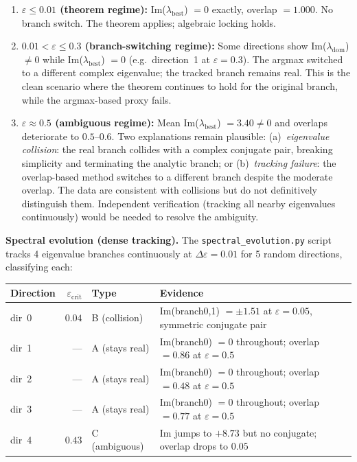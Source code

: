 \documentclass[11pt]{amsart}
\begin{document}
\begin{enumerate}
\item \textbf{$\varepsilon \leq 0.01$ (theorem regime):}
  Im($\lambda_\mathrm{best}$) $= 0$ exactly, overlap $= 1.000$.
  No branch switch. The theorem applies; algebraic locking holds.

\item \textbf{$0.01 < \varepsilon \leq 0.3$ (branch-switching regime):}
  Some directions show Im($\lambda_\mathrm{dom}$) $\neq 0$ while
  Im($\lambda_\mathrm{best}$) $= 0$ (e.g.\ direction~1 at $\varepsilon=0.3$).
  The argmax switched to a different complex eigenvalue;
  the tracked branch remains real.
  This is the clean scenario where the theorem continues to hold
  for the original branch, while the argmax-based proxy fails.

\item \textbf{$\varepsilon \approx 0.5$ (ambiguous regime):}
  Mean Im($\lambda_\mathrm{best}$) $= 3.40 \neq 0$ and overlaps
  deteriorate to $0.5$--$0.6$.
  Two explanations remain plausible:
  (a)~\emph{eigenvalue collision}: the real branch collides with a
  complex conjugate pair, breaking simplicity and terminating the
  analytic branch; or
  (b)~\emph{tracking failure}: the overlap-based method switches to a
  different branch despite the moderate overlap.
  The data are consistent with collisions but do not definitively
  distinguish them.
  Independent verification (tracking all nearby eigenvalues continuously)
  would be needed to resolve the ambiguity.
\end{enumerate}

\textbf{Spectral evolution (dense tracking).}
The \texttt{spectral\_evolution.py} script tracks 4 eigenvalue branches
continuously at $\Delta\varepsilon = 0.01$ for 5 random directions,
classifying each:

\begin{center}\small
\begin{tabular}{@{}lrll@{}}
\toprule
Direction & $\varepsilon_\mathrm{crit}$ & Type & Evidence \\
\midrule
dir~0 & $0.04$ & B (collision) & Im(branch0,1) $= \pm 1.51$ at $\varepsilon=0.05$,
                                  symmetric conjugate pair \\
dir~1 & --- & A (stays real) & Im(branch0) $= 0$ throughout; overlap $= 0.86$ at $\varepsilon=0.5$ \\
dir~2 & --- & A (stays real) & Im(branch0) $= 0$ throughout; overlap $= 0.48$ at $\varepsilon=0.5$ \\
dir~3 & --- & A (stays real) & Im(branch0) $= 0$ throughout; overlap $= 0.77$ at $\varepsilon=0.5$ \\
dir~4 & $0.43$ & C (ambiguous) & Im jumps to $+8.73$ but no conjugate; overlap drops to $0.05$ \\
\bottomrule
\end{tabular}
\end{center}
\end{document}
